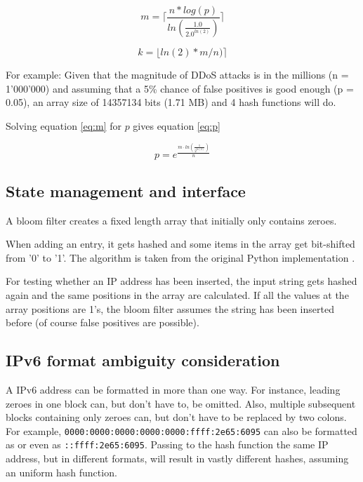 \begin{equation}
m = \lceil\frac{n * log(p)}{ln(\frac{1.0}{2.0 ^{ln(2)}})}\rceil
\label{eq:m}
\end{equation}

\begin{equation}
k = \lfloor ln(2) * m / n) \rceil
\label{eq:k}
\end{equation}

For example: Given that the magnitude of DDoS attacks is in the millions (n = 1'000'000) and assuming that a 5\% chance of false positives is good enough (p = 0.05), an array size of 14357134 bits (1.71 MB) and 4 hash functions will do.

Solving equation \ref{eq:m} for $p$ gives equation \ref{eq:p}

\begin{equation}
p = e^{\frac{{m \cdot ln(\frac{1}{2^{ln(2)}})}}{n}}
\label{eq:p}
\end{equation}

\subsection{State management and interface}

A bloom filter creates a fixed length array that initially only contains zeroes.


When adding an entry, it gets hashed and some items in the array get bit-shifted from '0' to '1'. The algorithm is taken from the original Python implementation \cite{SimpleBloomFilter}.



For testing whether an IP address has been inserted, the input string gets hashed again and the same positions in the array are calculated. If all the values at the array positions are 1's, the bloom filter assumes the string has been inserted before (of course false positives are possible).




\subsection{IPv6 format ambiguity consideration}

A IPv6 address can be formatted in more than one way. \cite{RFC4291I66} For instance, leading zeroes in one block can, but don't have to, be omitted. Also, multiple subsequent blocks containing only zeroes can, but don't have to be replaced by two colons.
For example, \texttt{0000:0000:0000:0000:0000:ffff:2e65:6095} can also be formatted as
 or even as \texttt{::ffff:2e65:6095}. Passing to the hash function the same IP address, but in different formats, will result in vastly different hashes, assuming an uniform hash function.

